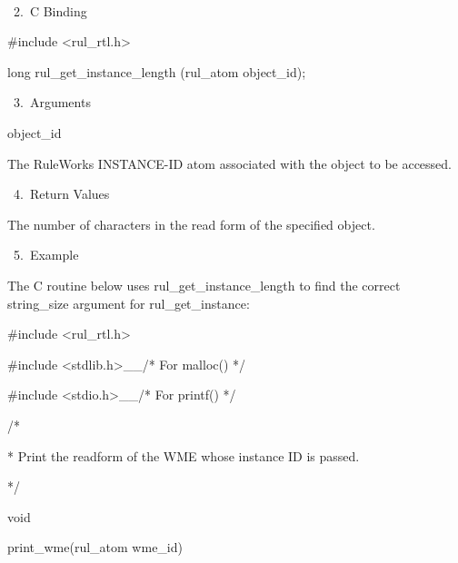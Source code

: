            

       2. C Binding

          #include <rul_rtl.h>

          long rul_get_instance_length
          (rul_atom object_id);

       3. Arguments

          object_id

          The RuleWorks INSTANCE-ID atom
          associated with the object to be
          accessed.

       4. Return Values

          The number of characters in the read
          form of the specified object.

       5. Example

          The C routine below uses
          rul_get_instance_length to find the
          correct string_size argument for
          rul_get_instance:

          #include <rul_rtl.h>

          #include <stdlib.h>__/* For malloc()
          */

          #include <stdio.h>__/* For printf()
          */

          /*

          * Print the readform of the WME
          whose instance ID is passed.

          */

          void

          print_wme(rul_atom wme_id)

